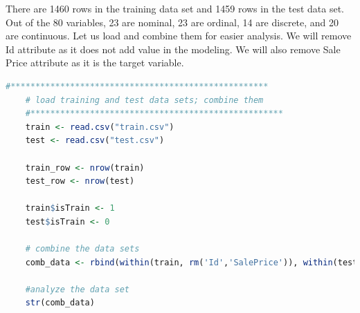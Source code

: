 \documentclass[sigconf]{acmart}
\begin{document}
	
	There are 1460 rows in the training data set and 1459 rows in the test data set. Out of the 80 variables, 23 are nominal, 23 are ordinal, 14 are discrete, and 20 are continuous. Let us load and combine them for easier analysis. We will remove Id attribute as it does not add value in the modeling. We will also remove Sale Price attribute as it is the target variable.
	
	\begin{lstlisting}[language=R]
	#****************************************************
	# load training and test data sets; combine them
	#***************************************************
	train <- read.csv("train.csv")
	test <- read.csv("test.csv")
	
	train_row <- nrow(train)
	test_row <- nrow(test)
	
	train$isTrain <- 1
	test$isTrain <- 0
	
	# combine the data sets
	comb_data <- rbind(within(train, rm('Id','SalePrice')), within(test, rm('Id')))
	
	#analyze the data set
	str(comb_data)
	\end{lstlisting}
	
\end{document}
